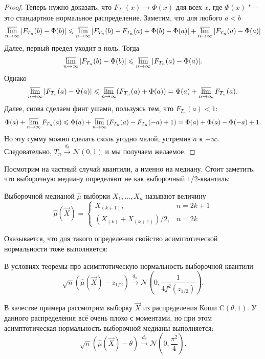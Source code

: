 \begin{proof}
	Теперь нужно доказать, что $F_{T_{n}}(x) \to \Phi(x)$ для всех $x$, где $\Phi(x)$ "--- это стандартное нормальное распределение.
	Заметим, что для любого $a < b$
	\[
		\varlimsup\limits_{n \to \infty} |F_{T_{n}}(b) - \Phi(b)| \leq \varlimsup\limits_{n \to \infty} |F_{T_{n}}(b) - F_{T_{n}}(a) + \Phi(b) - \Phi(a)| + \varlimsup\limits_{n \to \infty} |F_{T_{n}}(a) - \Phi(a)|
	\]
	Далее, первый предел уходит в ноль.
	Тогда
	\[
		\varlimsup\limits_{n \to \infty} |F_{T_{n}}(b) - \Phi(b)| \leq \varlimsup\limits_{n \to \infty} |F_{T_{n}}(a) - \Phi(a)|.
	\]
	Однако
	\[
		\varlimsup\limits_{n \to \infty} |F_{T_{n}}(a) - \Phi(a)| \leq \varlimsup\limits_{n \to \infty} (F_{T_{n}}(a) + \Phi(a)) = \Phi(a) + \varlimsup\limits_{n \to \infty} F_{T_{n}}(a).
	\]
	Далее, снова сделаем финт ушами, пользуясь тем, что $F_{T_{n}}(a) < 1$:
	\[
		\Phi(a) + \varlimsup\limits_{n \to \infty} F_{T_{n}}(a) \leq \Phi(a) + \varlimsup\limits_{n \to \infty} (F_{T_{n}}(a) - F_{T_{n}}(-a) + 1) = \Phi(a) + \Phi(a) - \Phi(-a) + 1.
	\]
	Но эту сумму можно сделать сколь угодно малой, устремив $a$ к $-\infty$.
	Следовательно, $T_{n} \xrightarrow{d_{\theta}} \mathcal{N}(0, 1)$ и мы получаем желаемое.
\end{proof}

Посмотрим на частный случай квантили, а именно на медиану.
Стоит заметить, что выборочную медиану определяют не как выборочный $1/2$-квантиль:
\begin{definition}
	Выборочной медианой $\hat{\mu}$ выборки $X_{1}, \ldots, X_{n}$ называют величину
	\[
		\hat{\mu}(\vec{X}) = \begin{cases}
		X_{(k + 1)}, & n = 2k + 1 \\
		(X_{(k)} + X_{(k + 1)})/2, & n = 2k
		\end{cases}
	\]
\end{definition}
Оказывается, что для такого определения свойство асимптотической нормальности тоже выполняется:
\begin{exercise}
	В условиях теоремы про асимптотическую нормальность выборочной квантили
	\[
		\sqrt{n}(\hat{\mu}(\vec{X}) - z_{1/2}) \xrightarrow{d_{\theta}} \mathcal{N}\left(0, \frac{1}{4f^{2}(z_{1/2})}\right).
	\]
\end{exercise}
В качестве примера рассмотрим выборку $\vec{X}$ из распределения Коши $\mathrm{C}(\theta, 1)$.
У данного распределения всё очень плохо с моментами, но при этом асимптотическая нормальность выборочной медианы выполняется:
\[
	\sqrt{n}(\hat{\mu}(\vec{X}) - \theta) \xrightarrow{d_{\theta}} \mathcal{N}\left(0, \frac{\pi^{2}}{4}\right).
\]
